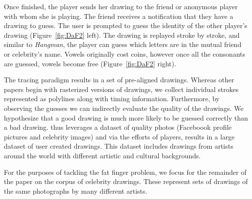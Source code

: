 Once finished, the player sends her drawing to the friend or anonymous player with whom she is playing. The friend receives a notification that they have a drawing to guess. The user is prompted to guess the identity of the other player's drawing (Figure~\ref{fig:DaF2} left). The drawing is replayed stroke by stroke, and similar to {\em Hangman}, the player can guess which letters are in the mutual friend or celebrity's name. Vowels originally cost coins, however once all the consonants are guessed, vowels become free (Figure~\ref{fig:DaF2} right).

The tracing paradigm results in a set of pre-aligned drawings. Whereas other papers begin with rasterized versions of drawings, we collect individual strokes represented as polylines along with timing information.  Furthermore, by observing the guesses we can indirectly evaluate the quality of the drawings. We hypothesize that a good drawing is much more likely to be guessed correctly than a bad drawing. \daf thus leverages a dataset of quality photos (Faceboook profile pictures and celebrity images) and via the efforts of players, results in a large dataset of user created drawings. This dataset includes drawings from artists around the world with different artistic and cultural backgrounds.

For the purposes of tackling the fat finger problem, we focus for the remainder of the paper on the corpus of celebrity drawings. These represent sets of drawings of the same photographs by many different artists.
